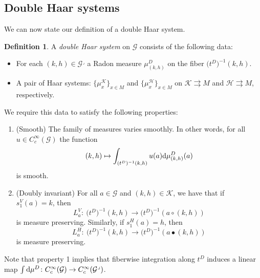 \documentclass[pdftex]{sigma}
\numberwithin{equation}{section}
\theoremstyle{definition}
\newtheorem{Definition}[Theorem]{Definition}
\newcommand{\CG}{\mathcal{G}}
\newcommand{\CH}{\mathcal{H}}
\newcommand{\CK}{\mathcal{K}}
\newcommand{\inv}{^{-1}}
\newcommand{\grpd}{\rightrightarrows}
\begin{document}
\subsection{Double Haar systems}
We can now state our definition of a double Haar system.

\begin{Definition}\label{defn:double.haar.system}
A \emph{double Haar system} on $ \CG $ consists of the following data:
\begin{itemize}\itemsep=0pt
  \item For each $ (k,h) \in \CG^\lrcorner $ a Radon measure $ \mu_{(k,h)}^D $ on the fiber $ \big(t^D\big)\inv(k,h) $.
  \item A pair of Haar systems: $ \big\{\mu_x^\CK\big\}_{x \in M} $ and $\big\{\mu_x^\CH\big\}_{x \in M } $ on $ \CK \grpd M $ and $ \CH \grpd M $, respectively.
\end{itemize}
We require this data to satisfy the following properties:
\begin{enumerate}\itemsep=0pt
  \item[(1)] (Smooth) The family of measures varies smoothly. In other words, for all $ u \in C^\infty_c(\CG) $ the function
  \[ (k,h) \mapsto \int_{(t^D)\inv(k,h)} u(a) {\rm d} \mu_{(k,h)}^D (a)\]
  is smooth.
  \item[(2)] (Doubly invariant) For all $ a \in \CG$ and $ (k,h) \in \CK $, we have that if $ s^V_1(a) = k $, then
  \[ L^V_a \colon\ \big(t^D\big)\inv(k,h) \to \big(t^D\big)\inv(a \circ (k,h))\]
  is measure preserving. Similarly, if $ s^H_1(a) = h $, then
    \[ L^H_a \colon\ \big(t^D\big)\inv(k,h) \to \big(t^D\big)\inv(a \bullet (k,h))\]
    is measure preserving.
\end{enumerate}
\end{Definition}
Note that property 1 implies that fiberwise integration along $ t^D $ induces a linear map
$\int {\rm d} \mu^D \colon\allowbreak C^\infty_c(\CG) \to C^\infty_c(\CG^\lrcorner)$.
\end{document}
